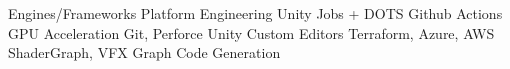 

\begin{center}
\begin{skills}
                     {Engines/Frameworks}                {Platform Engineering}
                               {Unity Jobs + DOTS}                 {Github Actions}
                   {GPU Acceleration}                  {Git, Perforce}
                  {Unity Custom Editors}              {Terraform, Azure, AWS}
                   {ShaderGraph, VFX Graph}            {Code Generation}
\end{skills}
\end{center}
